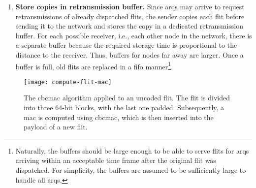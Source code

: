 \begin{enumerate}
    \item \textbf{Store copies in retransmission buffer.} Since \glspl{arq} may arrive to request retransmissions of already dispatched flits, the
        sender copies each flit before sending it to the network and stores the copy in a dedicated retransmission buffer. For each possible receiver,
        i.e., each other node in the network,
        there is a separate buffer because the required storage time is proportional to the distance to the receiver. Thus, buffers for nodes far away are
        larger. Once a buffer is full, old flits are replaced in a \gls{fifo} manner\footnote{Naturally, the buffers should be large enough to be
        able to serve flits for \glspl{arq} arriving within an acceptable time frame after the original flit was dispatched. For simplicity, the
        buffers are assumed to be sufficiently large to handle all \glspl{arq}.}.
\end{enumerate}
\vspace{0.5\baselineskip}

\begin{figure}
    \centering
    \texttt{[image: compute-flit-mac]}
    \caption[CBC-MAC algorithm applied to an uncoded flit]{The \gls{cbcmac} algorithm applied to an uncoded flit. The flit is divided into three
    64-bit blocks, with the last one padded. Subsequently, a \gls{mac} is computed using \gls{cbcmac}, which is then inserted into the payload of a
    new flit.}
    \label{fig:computeflitmac}
\end{figure}

